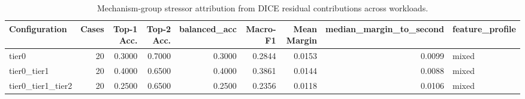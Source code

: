 \begin{table}[t]
\centering
\caption{Mechanism-group stressor attribution from DICE residual contributions across workloads.}
\label{tab:dice_stressor_diagnosis}
\footnotesize
\begin{tabular}{lrrrrrrrl}
\toprule
Configuration & Cases & Top-1 Acc. & Top-2 Acc. & balanced_acc & Macro-F1 & Mean Margin & median_margin_to_second & feature_profile \\
\midrule
tier0 & 20 & 0.3000 & 0.7000 & 0.3000 & 0.2844 & 0.0153 & 0.0099 & mixed \\
tier0_tier1 & 20 & 0.4000 & 0.6500 & 0.4000 & 0.3861 & 0.0144 & 0.0088 & mixed \\
tier0_tier1_tier2 & 20 & 0.2500 & 0.6500 & 0.2500 & 0.2356 & 0.0118 & 0.0106 & mixed \\
\bottomrule
\end{tabular}

\end{table}
